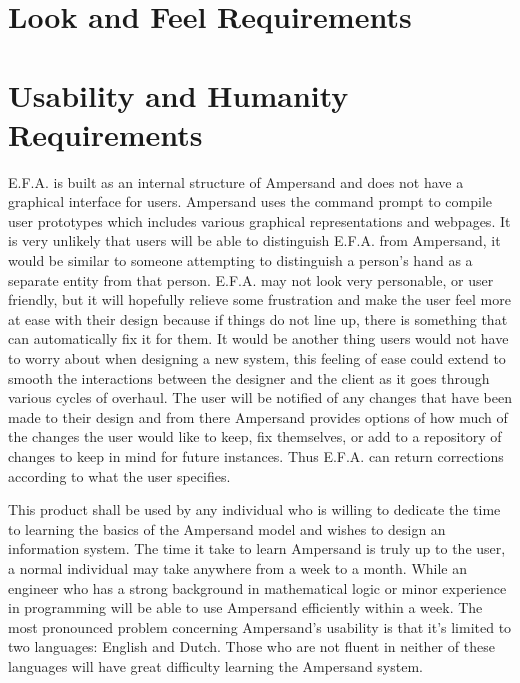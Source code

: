 \documentclass[12pt]{report}
\begin{document}
\section{Look and Feel Requirements}\label{sec:LookAndFeel} 




\section{Usability and Humanity Requirements}\label{sec:Usability}
E.F.A. is built as an internal structure of Ampersand and does not have a graphical interface for 
users. Ampersand uses the command prompt to compile user prototypes which includes various 
graphical representations and webpages. It is very unlikely that users will be able to distinguish 
E.F.A. from Ampersand, it would be similar to someone attempting to distinguish a person’s hand as 
a separate entity from that person. E.F.A. may not look very personable, or user friendly, but it 
will hopefully relieve some frustration and make the user feel more at ease with their design 
because if things do not line up, there is something that can automatically fix it for them. It 
would be another thing users would not have to worry about when designing a new system, this 
feeling of ease could extend to smooth the interactions between the designer and the client as it 
goes through various cycles of overhaul. The user will be notified of any changes that have been 
made to their design and from there Ampersand provides options of how much of the changes the user 
would like to keep, fix themselves, or add to a repository of changes to keep in mind for future 
instances. Thus E.F.A. can return corrections according to what the user specifies.

This product shall be used by any individual who is willing to dedicate the time to learning the 
basics of the Ampersand model and wishes to design an information system. The time it take to learn 
Ampersand is truly up to the user, a normal individual may take anywhere from a week to a month. 
While an engineer who has a strong background in mathematical logic or minor experience in 
programming will be able to use Ampersand efficiently within a week. The most pronounced problem 
concerning Ampersand’s usability is that it’s limited to two languages: English and Dutch. Those 
who are not fluent in neither of these languages will have great difficulty learning the Ampersand 
system.
\end{document}
